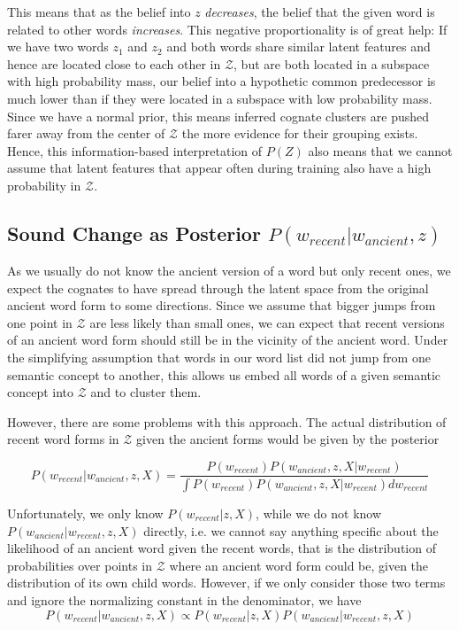 \documentclass[6pt]{article}
\begin{document}
This means that as the belief into $z$ \textit{decreases}, the belief that the given word is related to other words \textit{increases}. This negative proportionality is of great help: If we have two words $z_1$ and $z_2$ and both words share similar latent features and hence are located close to each other in $\mathcal{Z}$, but are both located in a subspace with high probability mass, our belief into a hypothetic common predecessor is much lower than if they were located in a subspace with low probability mass. Since we have a normal prior, this means inferred cognate clusters are pushed farer away from the center of $\mathcal{Z}$ the more evidence for their grouping exists. 
Hence, this information-based interpretation of $P(Z)$ also means that we cannot assume that latent features that appear often during training also have a high probability in $\mathcal{Z}$. 

\subsection{Sound Change as Posterior $P(w_{recent}|w_{ancient},z)$ }


As we usually do not know the ancient version of a word but only recent ones, we expect the cognates to have spread through the latent space from the original ancient word form to some directions. Since we assume that bigger jumps from one point in $\mathcal{Z}$ are less likely than small ones, we can expect that recent versions of an ancient word form should still be in the vicinity of the ancient word. Under the simplifying assumption that words in our word list did not jump from one semantic concept to another, this allows us embed all words of a given semantic concept into $\mathcal{Z}$ and to cluster them.

However, there are some problems with this approach.
The actual distribution of recent word forms in $\mathcal{Z}$ given the ancient forms would be given by the posterior

\begin{equation}
P(w_{recent}|w_{ancient},z,X) = \frac{P(w_{recent})P(w_{ancient},z,X|w_{recent})}{\int P(w_{recent})P(w_{ancient},z,X|w_{recent})dw_{recent}}
\end{equation}

Unfortunately, we only know $P(w_{recent}|z,X)$, while we do not know $P(w_{ancient}|w_{recent},z,X)$ directly, i.e. we cannot say anything specific about the likelihood of an ancient word given the recent words, that is the distribution of probabilities over points in $\mathcal{Z}$ where an ancient word form could be, given the distribution of its own child words.
However, if we only consider those two terms and ignore the normalizing constant in the denominator, we have
\begin{equation}
P(w_{recent}|w_{ancient},z,X) \propto P(w_{recent}|z,X)P(w_{ancient}|w_{recent},z,X)
\end{equation}
\end{document}
